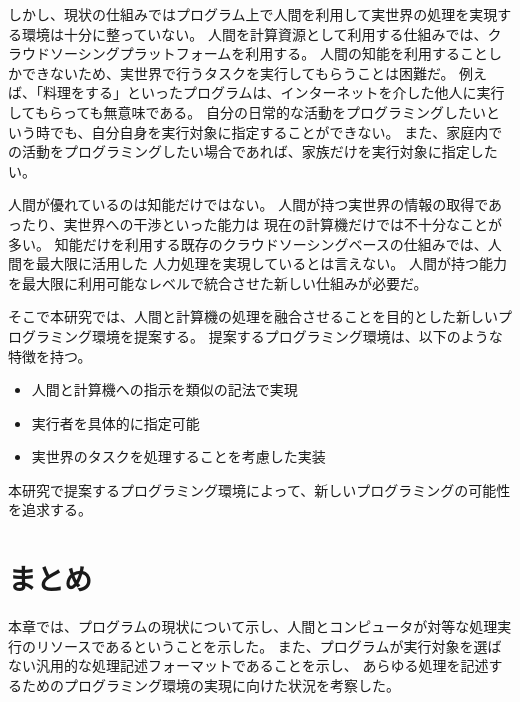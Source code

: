 しかし、現状の仕組みではプログラム上で人間を利用して実世界の処理を実現する環境は十分に整っていない。
人間を計算資源として利用する仕組みでは、クラウドソーシングプラットフォームを利用する。
人間の知能を利用することしかできないため、実世界で行うタスクを実行してもらうことは困難だ。
例えば、「料理をする」といったプログラムは、インターネットを介した他人に実行してもらっても無意味である。
自分の日常的な活動をプログラミングしたいという時でも、自分自身を実行対象に指定することができない。
また、家庭内での活動をプログラミングしたい場合であれば、家族だけを実行対象に指定したい。

人間が優れているのは知能だけではない。
人間が持つ実世界の情報の取得であったり、実世界への干渉といった能力は
現在の計算機だけでは不十分なことが多い。
知能だけを利用する既存のクラウドソーシングベースの仕組みでは、人間を最大限に活用した
人力処理を実現しているとは言えない。
人間が持つ能力を最大限に利用可能なレベルで統合させた新しい仕組みが必要だ。

そこで本研究では、人間と計算機の処理を融合させることを目的とした新しいプログラミング環境を提案する。
提案するプログラミング環境は、以下のような特徴を持つ。

\begin{itemize}
\itemsep1pt\parskip0pt
\item
  人間と計算機への指示を類似の記法で実現
\item
  実行者を具体的に指定可能
\item
  実世界のタスクを処理することを考慮した実装
\end{itemize}

本研究で提案するプログラミング環境によって、新しいプログラミングの可能性を追求する。

\section{まとめ}\label{ux307eux3068ux3081}

本章では、プログラムの現状について示し、人間とコンピュータが対等な処理実行のリソースであるということを示した。
また、プログラムが実行対象を選ばない汎用的な処理記述フォーマットであることを示し、
あらゆる処理を記述するためのプログラミング環境の実現に向けた状況を考察した。
